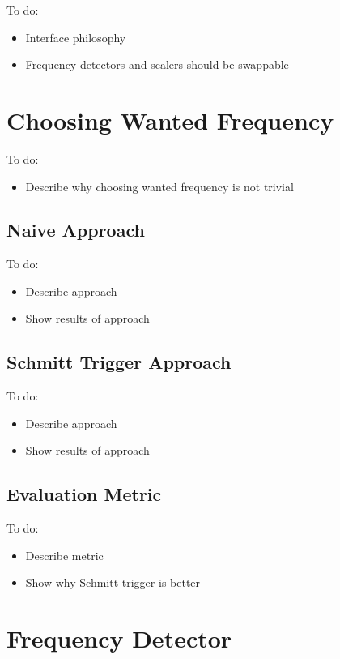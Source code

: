 \color{red}
To do:
\begin{itemize}
	\item Interface philosophy
	\item Frequency detectors and scalers should be swappable
\end{itemize}
\color{black}

\section{Choosing Wanted Frequency}

\color{red}
To do:
\begin{itemize}
	\item Describe why choosing wanted frequency is not trivial
\end{itemize}
\color{black}

\subsection{Naive Approach}

\color{red}
To do:
\begin{itemize}
	\item Describe approach
	\item Show results of approach
\end{itemize}
\color{black}

\subsection{Schmitt Trigger Approach}

\color{red}
To do:
\begin{itemize}
	\item Describe approach
	\item Show results of approach
\end{itemize}
\color{black}

\subsection{Evaluation Metric}

\color{red}
To do:
\begin{itemize}
	\item Describe metric
	\item Show why Schmitt trigger is better
\end{itemize}
\color{black}

\section{Frequency Detector}

